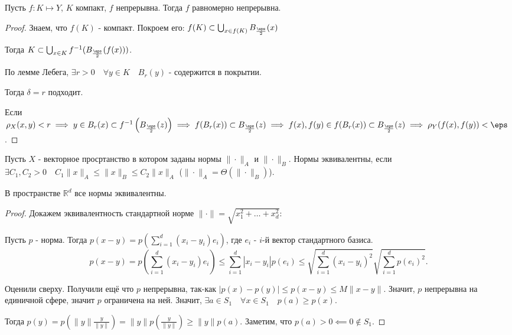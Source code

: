 \begin{theorem} \thmslashn

    Пусть $f : K \mapsto Y$, $K$ компакт, $f$ непрерывна. Тогда $f$ равномерно непрерывна.

    \begin{proof} \thmslashn
    
        Знаем, что $f(K)$ - компакт. Покроем его: $f(K) \subset \bigcup_{x\in f(K)} B_{\frac{\eps}{2}}(x) $

        Тогда $K \subset \bigcup_{x\in K} f^{-1}(B_{\frac{\eps}{2}}(f(x))) $.

        По лемме Лебега, $\exists{r > 0}\quad \forall{y\in K}\quad B_{r}(y) \text{ - содержится в покрытии}$.

        Тогда $\delta = r$ подходит. 

        Если $\rho_{X}(x,y) < r \implies y\in B_{r}(x) \subset f^{-1}\left( B_{\frac{\eps}{2}}(z) \right) \implies f(B_{r}(x)) \subset B_{\frac{\eps}{2}}(z) \implies f(x), f(y)\in f(B_{r}(x)) \subset B_{\frac{\eps}{2}}(z) \implies \rho_{Y}(f(x), f(y)) < \eps $.
    \end{proof}
\end{theorem}
\begin{definition} \thmslashn 

    Пусть $X$ - векторное просртанство в котором заданы нормы $\|\cdot \|_{A}$ и $\|\cdot \|_{B}$. Нормы эквивалентны, если $\exists{C_1, C_2 > 0}\quad C_1 \|x\|_{A} \le \|x\|_{B} \le C_2 \|x\|_{A}$ ($\|\cdot \|_{A} = \Theta\left( \|\cdot \|_{B} \right) $).
\end{definition}
\begin{theorem} \thmslashn

    В пространстве $\mathbb{R}^{d}$ все нормы эквивалентны.

    \begin{proof} \thmslashn
    
        Докажем эквивалентность стандартной норме $\|\cdot \| = \sqrt{x_{1}^2 + \ldots + x_{d}^2} $:
        
        Пусть $p$ - норма. Тогда $p(x-y) = p(\sum\limits_{i=1}^{d}(x_{i}-y_{i})e_{i})$, где $e_{i}$ - $i$-й вектор стандартного базиса.
        \[ p(x-y) = p\left( \sum\limits_{i=1}^{d}(x_{i}-y_{i})e_{i} \right) \le \sum\limits_{i=1}^{d} |x_{i}-y_{i}| p(e_{i}) \le \sqrt{\sum\limits_{i=1}^{d} (x_{i}-y_{i})^2 } \sqrt{\sum\limits_{i=1}^{d} p(e_{i})^2}   .\]
        
        Оценили сверху. Получили ещё что $p$ непрерывна, так-как $|p(x)-p(y)| \le p(x-y) \le M \|x-y\|$. Значит, $p$ непрерывна на единичной сфере, значит $p$ ограничена на ней. Значит, $\exists{a\in S_{1}}\quad \forall{x\in S_{1}}\quad p(a) \ge p(x)$.

        Тогда $p(y) = p\left(\|y\| \frac{y}{\|y\|}\right) = \|y\|p\left( \frac{y}{\|y\|} \right) \ge \|y\|p(a)$. Заметим, что $p(a) > 0 \impliedby 0 \not\in S_1$.
    \end{proof}
\end{theorem}
